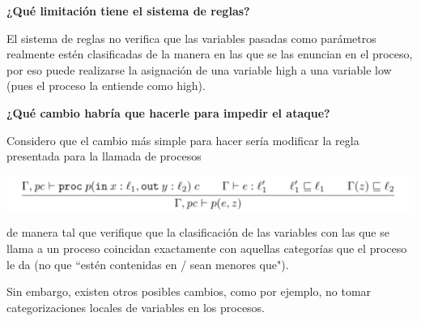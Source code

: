 \documentclass[11pt]{article}
\begin{document}
\textbf{¿Qué limitación tiene el sistema de reglas?}

El sistema de reglas no verifica que las variables pasadas como parámetros realmente estén clasificadas de la manera en las que se las enuncian en el proceso, por eso puede 
realizarse la asignación de una variable high a una variable low (pues el proceso la entiende como high).

\textbf{¿Qué cambio habría que hacerle para impedir el ataque?}

Considero que el cambio más simple para hacer sería modificar la regla presentada para la llamada de procesos

\includegraphics[scale=0.75]{Captura de pantalla de 2023-09-29 20-31-13.png}

de manera tal que verifique que la clasificación de las variables con las que se llama a un proceso coincidan exactamente con aquellas categorías que el proceso le da (no que ``estén contenidas en / sean menores que").

Sin embargo, existen otros posibles cambios, como por ejemplo, no tomar categorizaciones locales de variables en los procesos.
\end{document}
